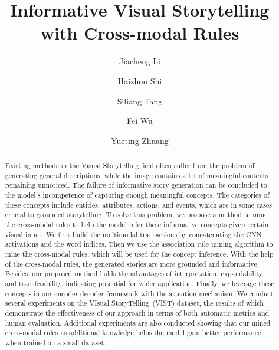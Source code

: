 \documentclass[sigconf]{acmart}
\begin{document}
\fancyhead{}



\title{Informative Visual Storytelling with Cross-modal Rules}








\author{Jiacheng Li}

\author{Haizhou Shi}

\author{Siliang Tang}

\author{Fei Wu}

\author{Yueting Zhuang}




\begin{abstract}
Existing methods in the Visual Storytelling field often suffer from the problem of generating general descriptions, while the image contains a lot of meaningful contents remaining unnoticed. The failure of informative story generation can be concluded to the model's incompetence of capturing enough meaningful concepts. The categories of these concepts include entities, attributes, actions, and events, which are in some cases crucial to grounded storytelling. To solve this problem, we propose a method to mine the cross-modal rules to help the model infer these informative concepts given certain visual input. We first build the multimodal transactions by concatenating the CNN activations and the word indices. Then we use the association rule mining algorithm to mine the cross-modal rules, which will be used for the concept inference. With the help of the cross-modal rules, the generated stories are more grounded and informative. Besides, our proposed method holds the advantages of interpretation, expandability, and transferability, indicating potential for wider application. Finally, we leverage these concepts in our encoder-decoder framework with the attention mechanism. We conduct several experiments on the VIsual StoryTelling~(VIST) dataset, the results of which demonstrate the effectiveness of our approach in terms of both automatic metrics and human evaluation. Additional experiments are also conducted showing that our mined cross-modal rules as additional knowledge helps the model gain better performance when trained on a small dataset.
\end{abstract}
\end{document}
